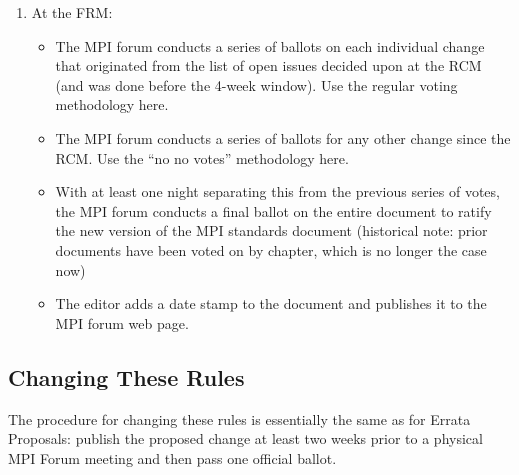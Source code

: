 {{\begin{enumerate}
\item At the FRM:
  \begin{itemize}
  \item The MPI forum conducts a series of ballots on each individual change that originated from the
    list of open issues decided upon at the RCM (and was done before the 4-week
    window).  Use the regular voting methodology here.
  \item The MPI forum conducts a series of ballots for any other change since the RCM.  Use the ``no
    no votes'' methodology here.
  \item With at least one night separating this from the previous series of votes, the MPI forum conducts a final ballot on the entire document to ratify the new version of the MPI standards document (historical note: prior documents have been voted on by chapter, which is no longer the case now)
  \item The editor adds a date stamp to the document and publishes it to the MPI forum web page.
  \end{itemize}
\end{enumerate}

}} %


\subsection{Changing These Rules}

The procedure for changing these rules is essentially the same as for
Errata Proposals: publish the proposed change at least two weeks prior
to a physical MPI Forum meeting and then pass one official ballot.

{\color{red}{The new rules take effect as soon as they are
  approved/voted in by the MPI Forum.}}

